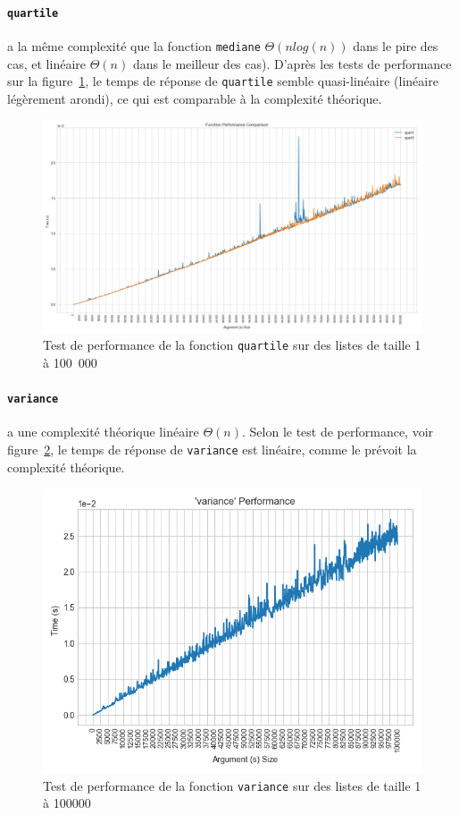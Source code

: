 \documentclass[12pt]{article}
\begin{document}
\paragraph{\texttt{quartile}} a la même complexité que la fonction \texttt{mediane} $\Theta(nlog(n))$ dans le pire des cas, et linéaire $\Theta(n)$ dans le meilleur des cas). D'après les tests de performance sur la figure~\ref{perfquart}, le temps de réponse de \texttt{quartile} semble quasi-linéaire (linéaire légèrement arondi), ce qui est comparable à la complexité théorique.
     \begin{figure}[!h]
        \centering
        \includegraphics[scale=0.6]{Images/Performance/Stats/performance_quartile_100000.png}
        \caption{Test de performance de la fonction \texttt{quartile} sur des listes de taille 1 à 100~000}
        \label{perfquart}
    \end{figure}
\paragraph{\texttt{variance}} a une complexité théorique linéaire $\Theta(n)$. Selon le test de performance, voir figure~\ref{perfvar}, le temps de réponse de \texttt{variance} est linéaire, comme le prévoit la complexité théorique.
     \begin{figure}[!h]
        \centering
        \includegraphics[scale=0.8]{Images/Performance/Stats/performance_variance_100000.png}
        \caption{Test de performance de la fonction \texttt{variance} sur des listes de taille 1 à 100000}
        \label{perfvar}
    \end{figure}
\end{document}

